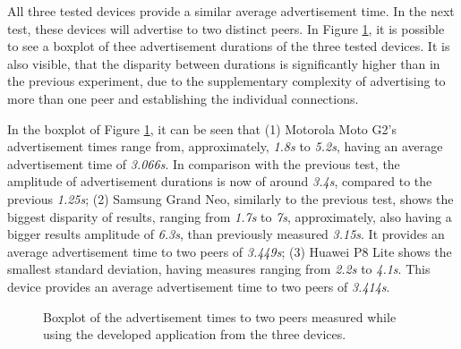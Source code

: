 All three tested devices provide a similar average advertisement time. In the next test, these devices will advertise to two distinct peers. In Figure \ref{fig:adv2}, it is possible to see a boxplot of thee advertisement durations of the three tested devices. It is also visible, that the disparity between durations is significantly higher than in the previous experiment, due to the supplementary complexity of advertising to more than one peer and establishing the individual connections.

In the boxplot of Figure \ref{fig:adv2}, it can be seen that (1) Motorola Moto G2's advertisement times range from, approximately, \textit{1.8s} to \textit{5.2s}, having an average advertisement time of \textit{3.066s}. In comparison with the previous test, the amplitude of advertisement durations is now of around \textit{3.4s}, compared to the previous \textit{1.25s}; (2) Samsung Grand Neo, similarly to the previous test, shows the biggest disparity of results, ranging from \textit{1.7s} to \textit{7s}, approximately, also having a bigger results amplitude of \textit{6.3s}, than previously measured \textit{3.15s}. It provides an average advertisement time to two peers of \textit{3.449s}; (3) Huawei P8 Lite shows the smallest standard deviation, having measures ranging from \textit{2.2s} to \textit{4.1s}. This device provides an average advertisement time to two peers of \textit{3.414s}.

\begin{figure}[ht]
	\noindent{}
	\caption{\label{fig:adv2} Boxplot of the advertisement times to two peers measured while using the developed application from the three devices.}
\end{figure}

